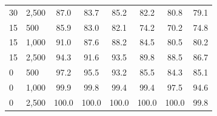 \documentclass[twoside,11pt]{article}\usepackage[]{graphicx}\usepackage[]{xcolor}
\newenvironment{knitrout}{}{} %
\begin{document}
\begin{knitrout}
\begin{landscape}
\begin{longtable}[t]{llcccccc}
\hspace{1em}30 & 2,500 & 87.0 & 83.7 & 85.2 & 82.2 & 80.8 & 79.1\\
\hspace{1em}15 & 500 & 85.9 & 83.0 & 82.1 & 74.2 & 70.2 & 74.8\\
\hspace{1em}15 & 1,000 & 91.0 & 87.6 & 88.2 & 84.5 & 80.5 & 80.2\\
\hspace{1em}15 & 2,500 & 94.3 & 91.6 & 93.5 & 89.8 & 88.5 & 86.7\\
\hspace{1em}0 & 500 & 97.2 & 95.5 & 93.2 & 85.5 & 84.3 & 85.1\\
\hspace{1em}0 & 1,000 & 99.9 & 99.8 & 99.4 & 99.4 & 97.5 & 94.6\\
\hspace{1em}0 & 2,500 & 100.0 & 100.0 & 100.0 & 100.0 & 100.0 & 99.8\\*
\end{longtable}
\end{landscape}

\end{knitrout}


\vskip 0.2in

\end{document}
